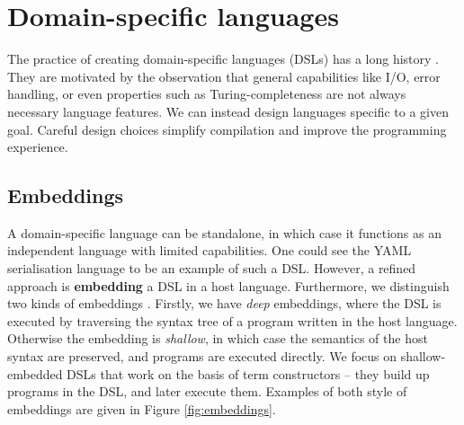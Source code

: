 
\section{Domain-specific languages}
\label{domain-specific-languages}

The practice of creating domain-specific languages (DSLs) has a long history \cite{hudak1996building}. They are motivated by the observation that general capabilities like I/O, error handling, or even properties such as Turing-completeness are not always necessary language features. We can instead design languages specific to a given goal. Careful design choices simplify compilation and improve the programming experience.

\subsection{Embeddings}

A domain-specific language can be standalone, in which case it functions as an independent language with limited capabilities. One could see the YAML serialisation language to be an example of such a DSL. However, a refined approach is \textbf{embedding} a DSL in a host language. Furthermore, we distinguish two kinds of embeddings \cite{gibbons2014folding}. Firstly, we have \textit{deep} embeddings, where the DSL is executed by traversing the syntax tree of a program written in the host language. Otherwise the embedding is \textit{shallow}, in which case the semantics of the host syntax are preserved, and programs are executed directly. We focus on shallow-embedded DSLs that work on the basis of term constructors -- they build up programs in the DSL, and later execute them. Examples of both style of embeddings are given in Figure \ref{fig:embeddings}.


